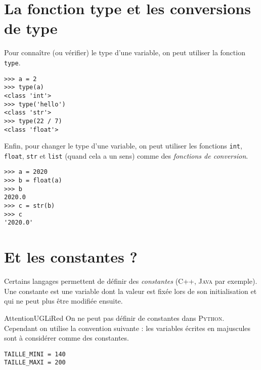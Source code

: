 \section{La fonction type et les conversions de type}

Pour connaître (ou vérifier) le type d'une variable, on peut utiliser la fonction \texttt{type}.

\begin{pys}\begin{verbatim}
>>> a = 2
>>> type(a)
<class 'int'>
>>> type('hello')
<class 'str'>
>>> type(22 / 7)
<class 'float'>
\end{verbatim}
\end{pys}


Enfin, pour changer le type d'une variable, on peut utiliser les fonctions \texttt{int}, \texttt{float}, \texttt{str} et \texttt{list} (quand cela a un sens) comme des \textit{fonctions de conversion}.

\begin{pys}\begin{verbatim}
>>> a = 2020
>>> b = float(a)
>>>	b
2020.0
>>> c = str(b)
>>> c
'2020.0'
\end{verbatim}
\end{pys}

\section{Et les constantes ?}


Certains langages permettent de définir des \textit{constantes} (\textsc{C++}, \textsc{Java} par exemple). Une constante est une variable dont la valeur est fixée lors de son initialisation et qui ne peut plus être modifiée ensuite.

\begin{encadrecolore}{Attention}{UGLiRed}
    On ne peut pas définir de constantes dans \textsc{Python}.\\
    Cependant on utilise la convention suivante : les variables écrites en majuscules sont à considérer comme des constantes.
\end{encadrecolore}

\begin{pyc}\begin{verbatim}
TAILLE_MINI = 140
TAILLE_MAXI = 200
\end{verbatim}
\end{pyc}


